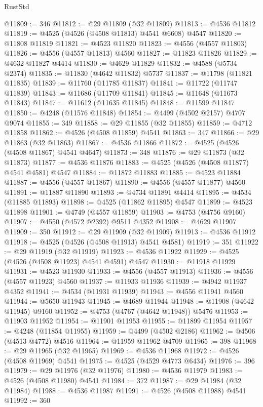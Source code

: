 \begin{lexlean}{RustStd}
\begin{coremodule}
@11809 := 346
@11812 := @29 @11809 (@32 @11809)
@11813 := @4536 @11812
@11819 := @4525 (@4526 (@4508 @11813) @4541 @6608) @4547
@11820 := @11808 @11819
@11821 := @4523 @11820
@11823 := @4556 (@4557 @11803)
@11826 := @4556 (@4557 @11813) @4560
@11827 := @11823 @11826
@11829 := @4632 @11827 @4414
@11830 := @4629 @11829
@11832 := @4588 (@5734 @2374)
@11835 := @11830 (@4642 @11832) @5737
@11837 := @11798 (@11821 @11835)
@11839 := @11760 (@11785 @11837)
@11841 := @11722 (@11747 @11839)
@11843 := @11686 (@11709 @11841)
@11845 := @11648 (@11673 @11843)
@11847 := @11612 (@11635 @11845)
@11848 := @11599 @11847
@11850 := @4248 (@11576 @11848)
@11854 := @4499 (@4502 @2157) @4707 @9074
@11855 := 349
@11858 := @29 @11855 (@32 @11855)
@11859 := @4712 @11858
@11862 := @4526 (@4508 @11859) @4541
@11863 := 347
@11866 := @29 @11863 (@32 @11863)
@11867 := @4536 @11866
@11872 := @4525 (@4526 (@4508 @11867) @4541 @4647)
@11873 := 348
@11876 := @29 @11873 (@32 @11873)
@11877 := @4536 @11876
@11883 := @4525 (@4526 (@4508 @11877) @4541 @4581) @4547
@11884 := @11872 @11883
@11885 := @4523 @11884
@11887 := @4556 (@4557 @11867)
@11890 := @4556 (@4557 @11877) @4560
@11891 := @11887 @11890
@11893 := @4734 @11891 @4414
@11895 := @4534 (@11885 @11893)
@11898 := @4525 (@11862 @11895) @4547
@11899 := @4523 @11898
@11901 := @4749 (@4557 @11859)
@11903 := @4753 (@4756 @9160)
@11907 := @4550 (@4572 @2392) @9511 @4352
@11908 := @4629 @11907
@11909 := 350
@11912 := @29 @11909 (@32 @11909)
@11913 := @4536 @11912
@11918 := @4525 (@4526 (@4508 @11913) @4541 @4581)
@11919 := 351
@11922 := @29 @11919 (@32 @11919)
@11923 := @4536 @11922
@11929 := @4525 (@4526 (@4508 @11923) @4541 @4591) @4547
@11930 := @11918 @11929
@11931 := @4523 @11930
@11933 := @4556 (@4557 @11913)
@11936 := @4556 (@4557 @11923) @4560
@11937 := @11933 @11936
@11939 := @4942 @11937 @4352
@11941 := @4534 (@11931 @11939)
@11943 := @4556 @11941 @4560
@11944 := @5650 @11943
@11945 := @4689 @11944
@11948 := @11908 (@4642 @11945) @9160
@11952 := @4753 (@4767 (@4642 @11948)) @5476
@11953 := @11903 @11952
@11954 := @11901 @11953
@11955 := @11899 @11954
@11957 := @4248 (@11854 @11955)
@11959 := @4499 (@4502 @2186)
@11962 := @4506 (@4513 @4772) @4516
@11964 := @11959 @11962 @4709
@11965 := 398
@11968 := @29 @11965 (@32 @11965)
@11969 := @4536 @11968
@11972 := @4526 (@4508 @11969) @4541
@11975 := @4525 (@4529 @4773 @6434)
@11976 := 396
@11979 := @29 @11976 (@32 @11976)
@11980 := @4536 @11979
@11983 := @4526 (@4508 @11980) @4541
@11984 := 372
@11987 := @29 @11984 (@32 @11984)
@11988 := @4536 @11987
@11991 := @4526 (@4508 @11988) @4541
@11992 := 360

\end{coremodule}
\end{lexlean}
